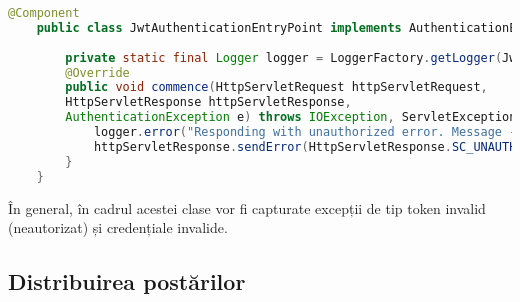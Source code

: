 \begin{lstlisting}[language=Java]
	@Component
	public class JwtAuthenticationEntryPoint implements AuthenticationEntryPoint {
		
		private static final Logger logger = LoggerFactory.getLogger(JwtAuthenticationEntryPoint.class);
		@Override
		public void commence(HttpServletRequest httpServletRequest,
		HttpServletResponse httpServletResponse,
		AuthenticationException e) throws IOException, ServletException {
			logger.error("Responding with unauthorized error. Message - {}", e.getMessage());
			httpServletResponse.sendError(HttpServletResponse.SC_UNAUTHORIZED, e.getMessage());
		}
	}
\end{lstlisting}
\bigskip
În general, în cadrul acestei clase vor fi capturate excepții de tip token invalid (neautorizat) și credențiale invalide.\newline

\subsection{Distribuirea postărilor}



\label{chap:03}